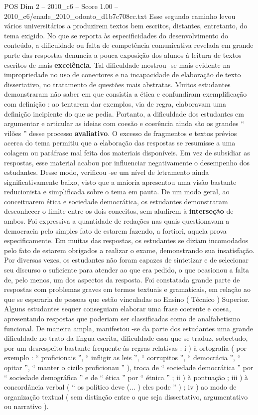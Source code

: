 \begin{textsample}{POS Dim 2 – 2010\_c6 – Score 1.00 – 2010\_c6/enade\_2010\_odonto\_d1b7c708cc.txt}
Esse segundo caminho levou vários universitários a produzirem textos bem escritos, distantes, entretanto, do tema exigido.
No que se reporta às especificidades do desenvolvimento do conteúdo, a dificuldade ou falta de competência comunicativa revelada em grande parte das respostas denuncia a pouca exposição dos alunos à leitura de textos escritos de mais \textbf{excelência}.
Tal dificuldade mostrou -se mais evidente na impropriedade no uso de conectores e na incapacidade de elaboração de texto dissertativo, no tratamento de questões mais abstratas.
Muitos estudantes demonstraram não saber em que consistia a ética e confundiram exemplificação com definição : ao tentarem dar exemplos, via de regra, elaboravam uma definição incipiente do que se pedia.
Portanto, a dificuldade dos estudantes em argumentar e articular as ideias com coesão e coerência ainda são os grandes “ vilões ” desse processo \textbf{avaliativo}.
O excesso de fragmentos e textos prévios acerca do tema permitiu que a elaboração das respostas se resumisse a uma colagem ou paráfrase mal feita dos materiais disponíveis.
Em vez de subsidiar as respostas, esse material acabou por influenciar negativamente o desempenho dos estudantes.
Desse modo, verificou -se um nível de letramento ainda significativamente baixo, visto que a maioria apresentou uma visão bastante reducionista e simplificada sobre o tema em pauta.
De um modo geral, ao conceituarem ética e sociedade democrática, os estudantes demonstraram desconhecer o limite entre os dois conceitos, sem aludirem à \textbf{interseção} de ambos.
Foi expressiva a quantidade de redações nas quais questionavam a democracia pelo simples fato de estarem fazendo, a fortiori, aquela prova especificamente.
Em muitas das respostas, os estudantes se diziam incomodados pelo fato de estarem obrigados a realizar o exame, demonstrando sua insatisfação.
Por diversas vezes, os estudantes não foram capazes de sintetizar e de selecionar seu discurso o suficiente para atender ao que era pedido, o que ocasionou a falta de, pelo menos, um dos aspectos da resposta.
Foi constatada grande parte de respostas com problemas graves em termos textuais e gramaticais, em relação ao que se esperaria de pessoas que estão vinculadas ao Ensino ( Técnico ) Superior.
Alguns estudantes sequer conseguiam elaborar uma frase coerente e coesa, apresentando respostas que poderiam ser classificadas como de analfabetismo funcional.
De maneira ampla, manifestou -se da parte dos estudantes uma grande dificuldade no trato da língua escrita, dificuldade essa que se traduz, sobretudo, por um desrespeito bastante frequente às regras relativas : i ) à ortografia ( por exemplo : “ proficionais ”, “ infligir as leis ”, “ corrupitos ”, “ democrácia ”, “ opitar ”, “ manter o cizilo proficionau ” ), troca de “ sociedade democrática ” por “ sociedade demográfica ” e de “ ética ” por “ étnica ” ; ii ) à pontuação ; iii ) à concordância verbal ( “ os político deve (... ) eles pode ” ) ; iv ) ao modo de organização textual ( sem distinção entre o que seja dissertativo, argumentativo ou narrativo ).

\end{textsample}
